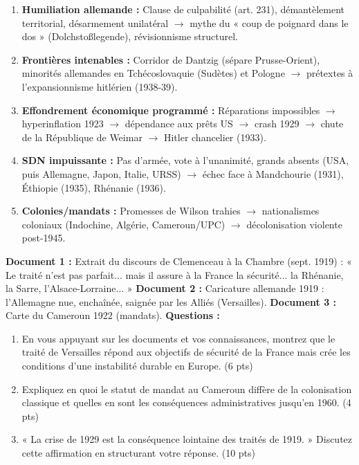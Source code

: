 \documentclass[11pt]{article}
\begin{document}
\begin{aretenir}
\begin{enumerate}
    \item \textbf{Humiliation allemande :} Clause de culpabilité (art. 231), démantèlement territorial, désarmement unilatéral $\rightarrow$ mythe du « coup de poignard dans le dos » (Dolchstoßlegende), révisionnisme structurel.
    \item \textbf{Frontières intenables :} Corridor de Dantzig (sépare Prusse-Orient), minorités allemandes en Tchécoslovaquie (Sudètes) et Pologne $\rightarrow$ prétextes à l'expansionnisme hitlérien (1938-39).
    \item \textbf{Effondrement économique programmé :} Réparations impossibles $\rightarrow$ hyperinflation 1923 $\rightarrow$ dépendance aux prêts US $\rightarrow$ crash 1929 $\rightarrow$ chute de la République de Weimar $\rightarrow$ Hitler chancelier (1933).
    \item \textbf{SDN impuissante :} Pas d'armée, vote à l'unanimité, grands absents (USA, puis Allemagne, Japon, Italie, URSS) $\rightarrow$ échec face à Mandchourie (1931), Éthiopie (1935), Rhénanie (1936).
    \item \textbf{Colonies/mandats :} Promesses de Wilson trahies $\rightarrow$ nationalismes coloniaux (Indochine, Algérie, Cameroun/UPC) $\rightarrow$ décolonisation violente post-1945.
\end{enumerate}
\end{aretenir}

\begin{exercice}
\textbf{Document 1 :} Extrait du discours de Clemenceau à la Chambre (sept. 1919) : « Le traité n'est pas parfait... mais il assure à la France la sécurité... la Rhénanie, la Sarre, l'Alsace-Lorraine... »
\textbf{Document 2 :} Caricature allemande 1919 : l'Allemagne nue, enchaînée, saignée par les Alliés (Versailles).
\textbf{Document 3 :} Carte du Cameroun 1922 (mandats).
\textbf{Questions :}
\begin{enumerate}
    \item En vous appuyant sur les documents et vos connaissances, montrez que le traité de Versailles répond aux objectifs de sécurité de la France mais crée les conditions d'une instabilité durable en Europe. (6 pts)
    \item Expliquez en quoi le statut de mandat au Cameroun diffère de la colonisation classique et quelles en sont les conséquences administratives jusqu'en 1960. (4 pts)
    \item « La crise de 1929 est la conséquence lointaine des traités de 1919. » Discutez cette affirmation en structurant votre réponse. (10 pts)
\end{enumerate}
\end{exercice}
\end{document}
